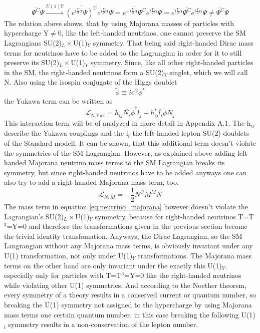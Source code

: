 \begin{equation*}
	\overline{\Psi^C}\Psi \overset{U(1)Y}{\longrightarrow}\overline{(e^{i\frac{Y}{2}\alpha}\Psi)^C}e^{i\frac{Y}{2}\alpha}\Psi=\overline{e^{-i\frac{Y}{2}\alpha}\Psi^C}e^{i\frac{Y}{2}\alpha}\Psi=e^{i\frac{Y}{2}\alpha}\overline{\Psi^C}e^{i\frac{Y}{2}\alpha}\Psi\neq	\overline{\Psi^C}\Psi
\end{equation*}
The relation above shows, that by using Majorana masses of particles with hypercharge Y$\neq$0, like the left-handed neutrinos, one cannot preserve the SM Lagrangians SU(2)$_L\times$U(1)$_Y$ symmetry. 
\newline
That being said right-handed Dirac mass terms for neutrinos have to be added to the Lagrangian in order for it to still preserve its SU(2)$_L\times$U(1)$_Y$ symmetry. Since, like all other right-handed particles in the SM, the right-handed neutrinos form a SU(2)$_Y$ singlet, which we will call N. Also using the isospin conjugate of the Higgs doublet 
\begin{equation*}
	\tilde{\phi}\equiv i\sigma^2\phi^*
\end{equation*}
the Yukawa term can be written as
\begin{equation}
	\mathcal{L}_{\text{N,Yuk}}=h_{ij}\overline{N_i}\tilde{\phi}^\dagger l_j +h_{ij}^* \overline{l_i}\tilde{\phi} N_j
	\label{eq:Yukterm}
\end{equation}
This interaction term will be of analyzed in more detail in Appendix A.1. \newline
The h$_{ij}$ describe the Yukawa couplings and the l$_i$ the left-handed lepton SU(2) doublets of the Standard modell. It can be shown, that this additional term doesn't violate the symmetries of the SM Lagrangian. \newline
However, as explained above adding left-handed Majorana neutrino mass terms to the SM Lagrangian breaks its symmetry, but since right-handed neutrinos have to be added anyways one can also try to add a right-handed Majorana mass term, too.
\begin{equation}
\mathcal{L}_{N,M}=-\frac{1}{2}\overline{N^C}M^MN
\label{eq:neutrino_majorana}
\end{equation}
The mass term in equation \ref{eq:neutrino_majorana} however doesn't violate the Lagrangian's SU(2)$_L\times$U(1)$_Y$ symmetry, because for right-handed neutrinos T=T$^3$=Y=0 and therefore the transformations given in the previous section become the trivial identity transfomation. Anyways, the Dirac Lagrangian, so the SM Langrangian without any Majorana mass terms, is obviously invariant under any U(1) transformation, not only under U(1)$_Y$ transformations. The Majorana mass terms on the other hand are only invariant under the exactly this U(1)$_Y$, especially only for particles with T=T$^3$=Y=0 like the right-handed neutrinos while violating other U(1) symmetries. And according to the Noether theorem, every symmetry of a theory results in a conserved current or quantum number, so breaking the U(1) symmetry not assigned to the hypercharge by using Majorana mass terms one certain quantum number, in this case breaking the following U(1)$_l$ symmetry results in a non-conservation of the lepton number.
